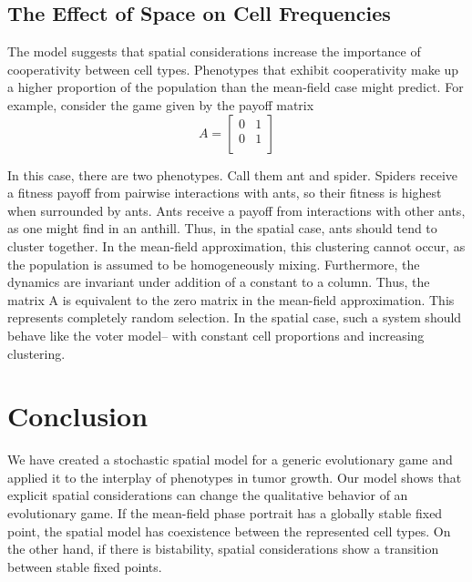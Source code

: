 \documentclass[12pt]{amsart}
\begin{document}
\pagebreak

\subsection{The Effect of Space on Cell Frequencies}
The model suggests that spatial considerations increase the importance of cooperativity between cell types. Phenotypes that exhibit cooperativity make up a higher proportion of the population than the mean-field case might predict. For example, consider the game given by the payoff matrix
$$A = {\begin{bmatrix}
  0 & 1\\
  0 & 1 \\
\end{bmatrix}}$$

In this case, there are two phenotypes. Call them ant and spider. Spiders receive a fitness payoff from pairwise interactions with ants, so their fitness is highest when surrounded by ants. Ants receive a payoff from interactions with other ants, as one might find in an anthill. Thus, in the spatial case, ants should tend to cluster together. In the mean-field approximation, this clustering cannot occur, as the population is assumed to be homogeneously mixing. Furthermore, the dynamics are invariant under addition of a constant to a column. Thus, the matrix A is equivalent to the zero matrix in the mean-field approximation. This represents completely random selection. In the spatial case, such a system should behave like the voter model-- with constant cell proportions and increasing clustering.



\section{Conclusion}
We have created a stochastic spatial model for a generic evolutionary game and applied it to the interplay of phenotypes in tumor growth. Our model shows that explicit spatial considerations can change the qualitative behavior of an evolutionary game. If the mean-field phase portrait has a globally stable fixed point, the spatial model has coexistence between the represented cell types. On the other hand, if there is bistability, spatial considerations show a transition between stable fixed points. 

\pagebreak


\newpage 

\end{document}
